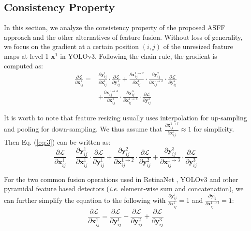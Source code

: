 \documentclass[10pt,twocolumn,letterpaper]{article}
\begin{document}
\subsection{Consistency Property}
In this section, we analyze the consistency property of the proposed ASFF approach and the other alternatives of feature fusion. Without loss of generality, we focus on the gradient at a certain position $(i,j)$ of the unresized feature maps at level 1 $\mathbf{x}^1$ in YOLOv3. Following the chain rule, the gradient is computed as:
\begin{equation}
\label{eq:3}
\begin{aligned}
\frac{\partial \mathcal{L}}{\partial \mathbf{x}_{ij}^1} =&
\frac{\partial \mathbf{y}_{ij}^1}{\partial \mathbf{x}_{ij}^1} \cdot 
\frac{\partial \mathcal{L}}{\partial \mathbf{y}_{ij}^1}        + 
\frac{\partial \mathbf{x}_{ij}^{1\rightarrow 2}}{\partial \mathbf{x}_{ij}^1} \cdot
\frac{\partial \mathbf{y}_{ij}^2}{\partial \mathbf{x}_{ij}^{1\rightarrow 2}} \cdot 
\frac{\partial \mathcal{L}}{\partial \mathbf{y}_{ij}^2}       \\
& +
\frac{\partial \mathbf{x}_{ij}^{1\rightarrow 3}}{\partial \mathbf{x}_{ij}^1} \cdot
\frac{\partial \mathbf{y}_{ij}^3}{\partial \mathbf{x}_{ij}^{1\rightarrow 3}} \cdot 
\frac{\partial \mathcal{L}}{\partial \mathbf{y}_{ij}^3}
\end{aligned}
\end{equation} 

It is worth to note that feature resizing usually uses interpolation for up-sampling and pooling for down-sampling. We thus assume that $\frac{\partial \mathbf{x}_{ij}^{1\rightarrow l}}{\partial \mathbf{x}_{ij}^1}\approx 1$ for simplicity. Then Eq. (\ref{eq:3}) can be written as:
\begin{equation}
\label{eq:4}
\frac{\partial \mathcal{L}}{\partial \mathbf{x}_{ij}^1} =
\frac{\partial \mathbf{y}_{ij}^1}{\partial \mathbf{x}_{ij}^1} \cdot 
\frac{\partial \mathcal{L}}{\partial \mathbf{y}_{ij}^1}        + 
\frac{\partial \mathbf{y}_{ij}^2}{\partial \mathbf{x}_{ij}^{1\rightarrow 2}}  \cdot 
\frac{\partial \mathcal{L}}{\partial \mathbf{y}_{ij}^2}        +
\frac{\partial \mathbf{y}_{ij}^3}{\partial \mathbf{x}_{ij}^{1\rightarrow 3}}  \cdot 
\frac{\partial \mathcal{L}}{\partial \mathbf{y}_{ij}^3}
\end{equation}

For the two common fusion operations used in RetinaNet \cite{focal-loss}, YOLOv3 \cite{yolov3} and other pyramidal feature based detectors (\emph{i.e.} element-wise sum and concatenation), we can further simplify the equation to the following with $\frac{\partial \mathbf{y}_{ij}^1}{\partial \mathbf{x}_{ij}^1} =1$ and $\frac{\partial \mathbf{y}_{ij}^l}{\partial \mathbf{x}_{ij}^{1\rightarrow l}}=1$:
\begin{equation}
\label{eq:5}
\frac{\partial \mathcal{L}}{\partial \mathbf{x}_{ij}^1} =
\frac{\partial \mathcal{L}}{\partial \mathbf{y}_{ij}^1}        +  
\frac{\partial \mathcal{L}}{\partial \mathbf{y}_{ij}^2}        +
\frac{\partial \mathcal{L}}{\partial \mathbf{y}_{ij}^3}
\end{equation}
\end{document}
